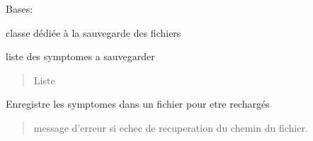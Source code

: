\documentclass[letterpaper,10pt,english]{sphinxmanual}
\begin{document}
\begin{fulllineitems}
\label{\detokenize{frise:frise.save.save}}
\pysigstartsignatures
{}
\pysigstopsignatures
\sphinxAtStartPar
Bases: 

\sphinxAtStartPar
classe dédiée à la sauvegarde des fichiers

\begin{fulllineitems}
\label{\detokenize{frise:frise.save.save.symptomes}}
\pysigstartsignatures
{}
\pysigstopsignatures
\sphinxAtStartPar
liste des symptomes a sauvegarder
\begin{quote}\begin{description}
\sphinxAtStartPar
Liste

\end{description}\end{quote}

\end{fulllineitems}


\begin{fulllineitems}
\label{\detokenize{frise:frise.save.save.save}}
\pysigstartsignatures
{}
\pysigstopsignatures
\sphinxAtStartPar
Enregistre les symptomes dans un fichier pour etre rechargés
\begin{quote}\begin{description}
\sphinxAtStartPar
{} \textendash{} message d’erreur si echec de recuperation du chemin du fichier.

\end{description}\end{quote}

\end{fulllineitems}



\end{fulllineitems}
\end{document}
